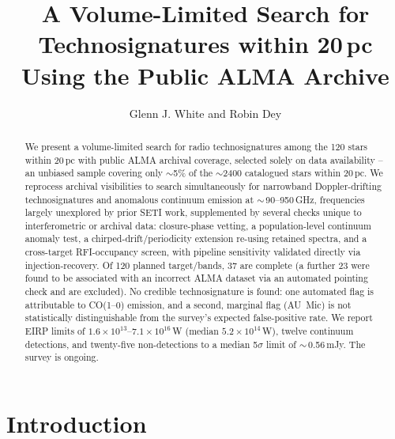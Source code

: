 \documentclass{openjournal}
\begin{document}
\title{A Volume-Limited Search for Technosignatures within 20\,pc Using the Public ALMA Archive}

\author{Glenn J. White and Robin Dey}

\begin{abstract}
We present a volume-limited search for radio technosignatures among the
120 stars within 20\,pc with public ALMA archival coverage, selected
solely on data availability -- an unbiased sample covering only
$\sim$5\% of the $\sim$2400 catalogued stars within 20\,pc. We reprocess
archival visibilities to search simultaneously for narrowband
Doppler-drifting technosignatures and anomalous continuum emission at
$\sim$\,90--950\,GHz, frequencies largely unexplored by prior SETI work,
supplemented by several checks unique to interferometric or archival
data: closure-phase vetting, a population-level continuum anomaly test,
a chirped-drift/periodicity extension re-using retained spectra, and a
cross-target RFI-occupancy screen, with pipeline sensitivity validated
directly via injection-recovery. Of 120 planned target/bands, 37 are
complete (a further 23 were found to be associated with an incorrect
ALMA dataset via an automated pointing check and are excluded). No
credible technosignature is found: one automated flag is attributable to
CO(1--0) emission, and a second, marginal flag (AU~Mic) is not
statistically distinguishable from the survey's expected false-positive
rate. We report EIRP limits of
$1.6\times10^{13}$--$7.1\times10^{16}$\,W (median $5.2\times10^{14}$\,W),
twelve continuum detections, and twenty-five non-detections to a median
5$\sigma$ limit of $\sim$\,0.56\,mJy. The survey is ongoing.
\end{abstract}


\section{Introduction}
\label{sec:intro}
\end{document}
